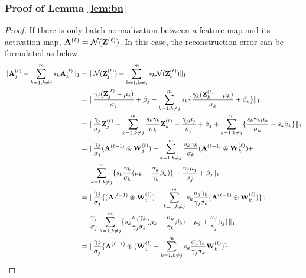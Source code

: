 \subsubsection{Proof of Lemma \ref{lem:bn}}
\begin{proof}
If there is only batch normalization between a feature map and its activation map, $\mathbf{A}^{(\ell)} = \mathcal{N}(\mathbf{Z}^{(\ell)})$. In this case, the reconstruction error can be formulated as below.
\small
\begin{eqnarray}
\begin{split}
     \|\mathbf{A}_{j}^{(\ell)}-\sum\limits_{k = 1, k \neq j}^{m}{s_{k}} \mathbf{A}_{k}^{(\ell)}\|_{1} = &~\| \N(\mathbf{Z_j^{(\ell)}}) - \sum\limits_{k = 1, k \neq j }^{m} s_{k} \N(\mathbf{Z}_k^{(\ell)}) \|_{1} \\
     =&~\| \frac{\gamma_{j}({\mathbf{Z}_j^{(\ell)} - \mu_j})}{\sigma_{j}} + \beta_j -\sum\limits_{k = 1, k \neq j}^{m}{s_{k}} \{ \frac{\gamma_{k}({\mathbf{Z}_k^{(\ell)} - \mu_k})}{\sigma_{k}} + \beta_k \} \|_{1}\\
     =&~\|\frac{\gamma_{j}}{\sigma_{j}}\mathbf{Z}_j^{(\ell)} - \sum\limits_{k = 1, k \neq j}^{m}\frac{s_{k}{\gamma_{k}}}{\sigma_{k}}\mathbf{Z}_k^{(\ell)}  -\frac{\gamma_{j}\mu_j}{\sigma_{j}} + \beta_j + \sum\limits_{k = 1, k \neq j}^{m}\{\frac{s_{k}{\gamma_{k}}\mu_k}{\sigma_{k}} - s_{k}\beta_k \}\|_{1} \\
     =&~\|\frac{\gamma_{j}}{\sigma_{j}}(\mathbf{A}^{(\ell-1)} \circledast \mathbf{W}_j^{(\ell)}) - \sum\limits_{k = 1, k \neq j}^{m}\frac{s_{k}{\gamma_{k}}}{\sigma_{k}}(\mathbf{A}^{(\ell-1)} \circledast \mathbf{W}_k^{(\ell)}) +  \\
     &~\sum\limits_{k = 1, k \neq j}^{m} \{{s_{k}} \frac{\gamma_{k}}{\sigma_{k}}(\mu_k - \frac{\sigma_{k}}{\gamma_{k}}\beta_k)\} -\frac{\gamma_{j}\mu_j}{\sigma_{j}} + \beta_j\|_{1}\\
     =&~\| \frac{\gamma_{j}}{\sigma_{j}} \{ (\mathbf{A}^{(\ell-1)} \circledast \mathbf{W}_j^{(\ell)})  - \sum\limits_{k = 1, k \neq j}^{m}s_k\frac{\sigma_{j}\gamma_{k}}{\gamma_{j}\sigma_{k}}(\mathbf{A}^{(\ell-1)} \circledast \mathbf{W}_k^{(\ell)}) \}  + \\
     &~\frac{\gamma_{j}}{\sigma_{j}}\sum\limits_{k = 1, k \neq j}^{m} \{s_k \frac{\sigma_{j}\gamma_{k}}{\gamma_{j}\sigma_{k}}(\mu_k - \frac{\sigma_{k}}{\gamma_{k}}\beta_k) - \mu_j +\frac{\sigma_{j}}{\gamma_{j}}\beta_j \}\|_{1}\\
     =&~\|\frac{\gamma_{j}}{\sigma_{j}} \{\mathbf{A}^{(\ell-1)} \circledast (\mathbf{W}_j^{(\ell)} - \sum\limits_{k = 1, k \neq j}^{m}s_k\frac{\sigma_{j}\gamma_{k}}{\gamma_{j}\sigma_{k}}\mathbf{W}_k^{(\ell)})\} \\

\end{split}
\end{eqnarray}
\end{proof}
